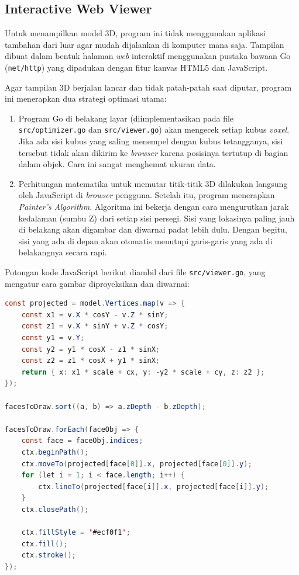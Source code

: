 \subsection{Interactive Web Viewer}\label{sub:Interactive Web Viewer} %
Untuk menampilkan model 3D, program ini tidak menggunakan aplikasi tambahan dari luar agar mudah dijalankan di komputer mana saja. Tampilan dibuat dalam bentuk halaman \textit{web} interaktif menggunakan pustaka bawaan Go (\texttt{net/http}) yang dipadukan dengan fitur kanvas HTML5 dan JavaScript.

Agar tampilan 3D berjalan lancar dan tidak patah-patah saat diputar, program ini menerapkan dua strategi optimasi utama:
\begin{enumerate}
    \item Program Go di belakang layar (diimplementasikan pada file \texttt{src/optimizer.go} dan \texttt{src/viewer.go}) akan mengecek setiap kubus \textit{voxel}. Jika ada sisi kubus yang saling menempel dengan kubus tetangganya, sisi tersebut tidak akan dikirim ke \textit{browser} karena posisinya tertutup di bagian dalam objek. Cara ini sangat menghemat ukuran data.
    \item Perhitungan matematika untuk memutar titik-titik 3D dilakukan langsung oleh JavaScript di \textit{browser} pengguna. Setelah itu, program menerapkan \textit{Painter's Algorithm}. Algoritma ini bekerja dengan cara mengurutkan jarak kedalaman (sumbu Z) dari setiap sisi persegi. Sisi yang lokasinya paling jauh di belakang akan digambar dan diwarnai padat lebih dulu. Dengan begitu, sisi yang ada di depan akan otomatis menutupi garis-garis yang ada di belakangnya secara rapi.
\end{enumerate}

Potongan kode JavaScript berikut diambil dari file \texttt{src/viewer.go}, yang mengatur cara gambar diproyeksikan dan diwarnai:

\begin{lstlisting}[language=Java, basicstyle=\ttfamily\small, breaklines=true]
const projected = model.Vertices.map(v => {
    const x1 = v.X * cosY - v.Z * sinY;
    const z1 = v.X * sinY + v.Z * cosY;
    const y1 = v.Y;
    const y2 = y1 * cosX - z1 * sinX;
    const z2 = z1 * cosX + y1 * sinX;
    return { x: x1 * scale + cx, y: -y2 * scale + cy, z: z2 };
});

facesToDraw.sort((a, b) => a.zDepth - b.zDepth);

facesToDraw.forEach(faceObj => {
    const face = faceObj.indices;
    ctx.beginPath();
    ctx.moveTo(projected[face[0]].x, projected[face[0]].y);
    for (let i = 1; i < face.length; i++) {
        ctx.lineTo(projected[face[i]].x, projected[face[i]].y);
    }
    ctx.closePath();
    
    ctx.fillStyle = '#ecf0f1';
    ctx.fill();
    ctx.stroke();
});
\end{lstlisting}

